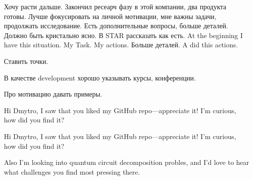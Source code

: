 Хочу расти дальше. Закончил ресеарч фазу в этой компании, два продукта готовы. 
Лучше фокусировать на личной мотивации, мне важны задачи, продолжать исследование. 
Есть дополнительные вопросы, больше деталей. Должно быть кристально ясно. В STAR рассказать как есть. 
At the beginning I have this situation. 
My Task. My actions. Больше деталей.
A did this actions.


Ставить точки. 

В качестве development хорошо указывать курсы, конференции.

Про мотивацию давать примеры. 

Hi Dmytro, I saw that you liked my GitHub repo—appreciate it! I’m curious, how did you find it?

Hi Dmytro, I saw that you liked my GitHub repo—appreciate it! I’m curious, how did you find it?

Also I’m looking into quantum circuit decomposition probles, and I’d love to hear what challenges you find most pressing there.